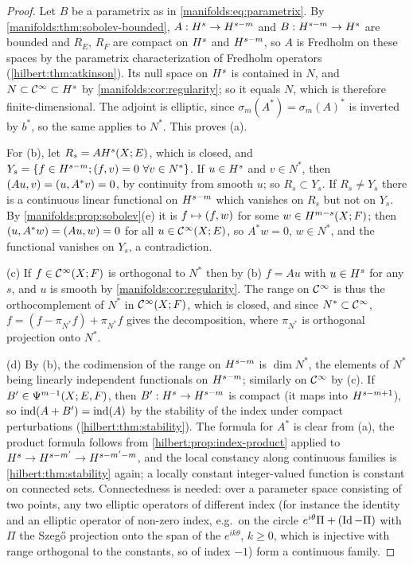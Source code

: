 \begin{proof}
Let $B$ be a parametrix as in \eqref{manifolds:eq:parametrix}. By
\cref{manifolds:thm:sobolev-bounded}, $A:H^{s}\to H^{s-m}$ and $B:H^{s-m}\to H^{s}$ are
bounded and $R_E$, $R_F$ are compact on $H^{s}$ and $H^{s-m}$, so $A$ is Fredholm on these
spaces by the parametrix characterization of Fredholm operators
(\cref{hilbert:thm:atkinson}). Its null space on $H^{s}$ is contained in $N$, and
$N\subset\mathcal{C}^\infty\subset H^{s}$ by \cref{manifolds:cor:regularity}; so it equals $N$, which is
therefore finite-dimensional. The adjoint is elliptic, since
$\sigma_m(A^*)=\sigma_m(A)^*$ is inverted by $b^*$, so the same applies to $N^*$. This
proves (a).

For (b), let $R_s=AH^{s}(X;E)$, which is closed, and
$Y_s=\{f\in H^{s-m};( f, v)=0\ \forall v\in N^*\}$. If $u\in H^{s}$ and $v\in N^*$, then
$( Au, v)=( u, A^*v)=0$, by continuity from smooth $u$; so $R_s\subset Y_s$.
If $R_s\ne Y_s$ there is a continuous linear functional on $H^{s-m}$ which vanishes on
$R_s$ but not on $Y_s$. By \cref{manifolds:prop:sobolev}(e) it is $f\mapsto( f, w)$ for some
$w\in H^{m-s}(X;F)$; then $( u, A^*w)=( Au, w)=0$ for all $u\in\mathcal{C}^\infty(X;E)$, so $A^*w=0$,
$w\in N^*$, and the functional vanishes on $Y_s$, a contradiction.

(c) If $f\in\mathcal{C}^\infty(X;F)$ is orthogonal to $N^*$ then by (b) $f=Au$ with $u\in H^{s}$ for
any $s$, and $u$ is smooth by \cref{manifolds:cor:regularity}. The range on $\mathcal{C}^\infty$ is
thus the orthocomplement of $N^*$ in $\mathcal{C}^\infty(X;F)$, which is closed, and since $N^*\subset\mathcal{C}^\infty$,
$f=(f-\pi_{N^*}f)+\pi_{N^*}f$ gives the decomposition, where $\pi_{N^*}$ is orthogonal
projection onto $N^*$.

(d) By (b), the codimension of the range on $H^{s-m}$ is $\dim N^*$, the elements of
$N^*$ being linearly independent functionals on $H^{s-m}$; similarly on $\mathcal{C}^\infty$ by
(c). If $B'\in\Psi^{m-1}(X;E,F)$, then $B':H^{s}\to H^{s-m}$ is compact (it maps into
$H^{s-m+1}$), so $\operatorname{ind}(A+B')=\operatorname{ind}(A)$ by the stability of the index under compact
perturbations (\cref{hilbert:thm:stability}). The formula for $A^*$ is clear from
(a), the product formula follows from \cref{hilbert:prop:index-product} applied to
$H^{s}\to H^{s-m'}\to H^{s-m'-m}$, and the local constancy along continuous families is
\cref{hilbert:thm:stability} again; a locally constant integer-valued function is constant
on connected sets. Connectedness is needed: over a parameter space consisting of two
points, any two elliptic operators of different index (for instance the identity and
an elliptic operator of non-zero index, e.g.\ on the circle
$e^{i\theta}\Pi+(\operatorname{Id}-\Pi)$ with $\Pi$ the Szeg\H o projection onto the span of the
$e^{ik\theta}$, $k\ge0$, which is injective with range orthogonal to the constants, so of
index $-1$) form a continuous family.
\end{proof}

